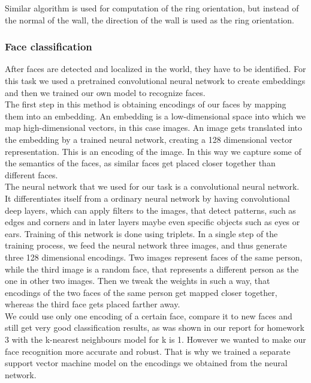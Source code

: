\documentclass[12pt,a4paper]{article}
\begin{document}
	Similar algorithm is used for computation of the ring orientation, but instead of the normal of the wall, the direction of the wall is used as the ring orientation. \\
	
	\subsubsection{Face classification}
	After faces are detected and localized in the world, they have to be identified. For this task we used a pretrained convolutional neural network to create embeddings and then we trained our own model to recognize faces. \\

	The first step in this method is obtaining encodings of our faces by mapping them into an embedding. An embedding is a low-dimensional space into which we map high-dimensional vectors, in this case images. An image gets translated into the embedding by a trained neural network, creating a 128 dimensional vector representation. This is an encoding of the image. In this way we capture some of the semantics of the faces, as similar faces get placed closer together than different faces. \\

	The neural network that we used for our task is a convolutional neural network. It differentiates itself from a ordinary neural network by having convolutional deep layers, which can apply filters to the images, that detect patterns, such as edges and corners and in later layers maybe even specific objects such as eyes or ears. Training of this network is done using triplets. In a single step of the training process, we feed the neural network three images, and thus generate three 128 dimensional encodings. Two images represent faces of the same person, while the third image is a random face, that represents a different person as the one in other two images. Then we tweak the weights in such a way, that encodings of the two faces of the same person get mapped closer together, whereas the third face gets placed farther away. \\

	We could use only one encoding of a certain face, compare it to new faces and still get very good classification results, as was shown in our report for homework 3 with the k-nearest neighbours model for k is 1. However we wanted to make our face recognition more accurate and robust. That is why we trained a separate support vector machine model on the encodings we obtained from the neural network. \\
\end{document}
